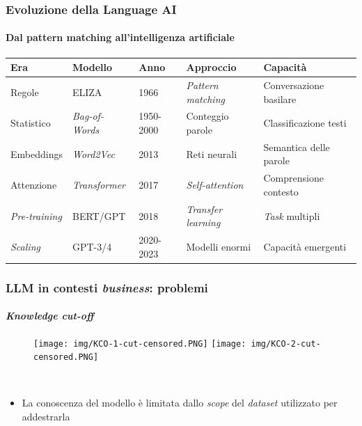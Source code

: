 \begin{frame}[t,fragile] \frametitle{Evoluzione della Language AI}
\framesubtitle{Dal pattern matching all'intelligenza artificiale}
    {\scriptsize
        \begin{center}
            \begin{table}
                \setlength{\tabcolsep}{0pt}
                \renewcommand{\arraystretch}{1.3}
                \begin{tabular}{p{1.8cm}p{2cm}p{1.5cm}p{2.5cm}p{2.8cm}}
                    \toprule
                    \textbf{Era} & \textbf{Modello} & \textbf{Anno} & \textbf{Approccio} & \textbf{Capacità}\\
                    \midrule
                    Regole & ELIZA & 1966 & \textit{Pattern matching} & Conversazione basilare\\
                    Statistico & \textit{Bag-of-Words} & 1950-2000 & Conteggio parole & Classificazione testi\\
                    Embeddings & \textit{Word2Vec} & 2013 & Reti neurali & Semantica delle parole\\
                    Attenzione & \textit{Transformer} & 2017 & \textit{Self-attention} & Comprensione contesto\\
                    \textit{Pre-training} & BERT/GPT & 2018 & \textit{Transfer learning} & \textit{Task} multipli\\
                    \textit{Scaling} & GPT-3/4 & 2020-2023 & Modelli enormi & Capacità emergenti\\
                    \bottomrule
                \end{tabular}
            \end{table}
        \end{center}
    }
\end{frame}
%
\begin{frame}[t] \frametitle{LLM in contesti \emph{business}: problemi}
\framesubtitle{\emph{Knowledge cut-off}}
{\scriptsize
{}
    \begin{minipage}[t]{\textwidth}
        \vspace*{-.5cm}
        \begin{figure}
            \centering
            \texttt{[image: img/KCO-1-cut-censored.PNG]}
            \texttt{[image: img/KCO-2-cut-censored.PNG]}
        \end{figure}
    \end{minipage}
    \\\vspace*{.3cm}
    \begin{itemize}[leftmargin=10pt,align=right]
        \item[\alert{\faArrowCircleRight}] La conoscenza del modello è limitata dallo \emph{scope} del \emph{dataset} utilizzato per addestrarla
    \end{itemize}
}
\end{frame}
